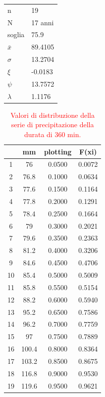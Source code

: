 \begin{table}[H]
\begin{minipage}{.5\linewidth}
        \begin{tabular}{ll}
            \toprule
            n        &   19      \\
            N        & 17 anni \\
            soglia   &   75.9      \\
            $\bar{x}$ &    89.4105    \\
            $\sigma$ &     13.2704    \\
            $\xi$      &     -0.0183  \\
            $\psi$      &  13.7572   \\
            $\lambda$   &   1.1176 \\
        \bottomrule        
        \end{tabular}
    \end{minipage} 
\end{table}

\begin{table}[H] \centering
    \caption{\textcolor{red}{Valori di distribuzione della serie di precipitazione della durata di 360 min.}}
            \begin{tabular}{cccc}
            \toprule
               & mm    & plotting & F(xi)  \\
            \midrule
            1  & 76    & 0.0500   & 0.0072 \\
            2  & 76.8  & 0.1000   & 0.0634 \\
            3  & 77.6  & 0.1500   & 0.1164 \\
            4  & 77.8  & 0.2000   & 0.1291 \\
            5  & 78.4  & 0.2500   & 0.1664 \\
            6  & 79    & 0.3000   & 0.2021 \\
            7  & 79.6  & 0.3500   & 0.2363 \\
            8  & 81.2  & 0.4000   & 0.3206 \\
            9  & 84.6  & 0.4500   & 0.4706 \\
            10 & 85.4  & 0.5000   & 0.5009 \\
            11 & 85.8  & 0.5500   & 0.5154 \\
            12 & 88.2  & 0.6000   & 0.5940 \\
            13 & 95.2  & 0.6500   & 0.7586 \\
            14 & 96.2  & 0.7000   & 0.7759 \\
            15 & 97    & 0.7500   & 0.7889 \\
            16 & 100.4 & 0.8000   & 0.8364 \\
            17 & 103.2 & 0.8500   & 0.8675 \\
            18 & 116.8 & 0.9000   & 0.9530 \\
            19 & 119.6 & 0.9500   & 0.9621 \\
            \bottomrule
            \end{tabular}
\end{table}

